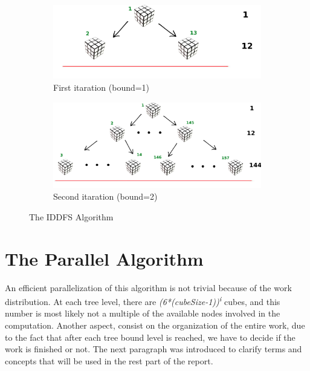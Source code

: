 \documentclass[a4paper]{article}
\begin{document}
\begin{figure}
\begin{subfigure}{0.40\textwidth}
\includegraphics[width=\linewidth]{rubik_tree_eval1}
\caption{First itaration (bound=1)} \label{fig:ita}
\end{subfigure}
\hspace*{\fill} %
\begin{subfigure}{0.60\textwidth}
\includegraphics[width=\linewidth]{rubik_tree_eval2}
\caption{Second itaration (bound=2)} \label{fig:itb}
\end{subfigure}
\caption{The IDDFS Algorithm} \label{fig:iterations}
\end{figure}
\FloatBarrier

\section{The Parallel Algorithm}
\label{sec:par_algo}
An efficient parallelization of this algorithm is not trivial because of the work distribution. At each tree level, there are \textit{(6*(cubeSize-1))\textsuperscript{i}} cubes, and this number is most likely not a multiple of the available nodes involved in the computation. Another aspect, consist on the organization of the entire work, due to the fact that after each tree bound level is reached, we have to decide if the work is finished or not.  The next paragraph was introduced to clarify terms and concepts that will be used in the rest part of the report.
\end{document}

